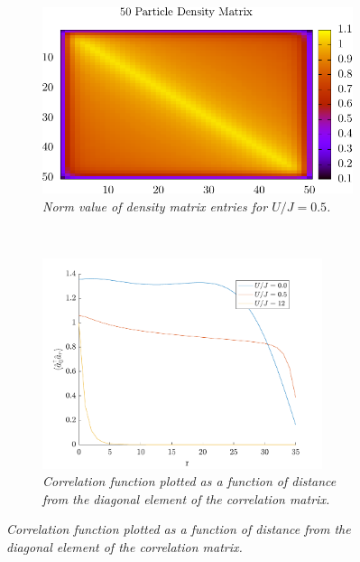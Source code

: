 \begin{figure}[h!]
\begin{subfigure}[t]{0.49\textwidth}
        \label{fig:DensityMatMI}
    \end{subfigure}
    ~
    \begin{subfigure}[t]{0.49\textwidth}
        \includegraphics[width=\textwidth]{Figures/U050.pdf}
        \caption{\textit{Norm value of density matrix entries for $U/J = 0.5$.}}
        \label{fig:DensityMat05}
    \end{subfigure}
    ~
    \begin{subfigure}[t]{0.49\textwidth}
        \includegraphics[width=0.9\textwidth]{Figures/correlationlength.pdf}
	\caption{\textit{Correlation function plotted as a function of distance from the diagonal element of the correlation matrix.}}
	\label{fig:expDecayCorrFunc}
    \end{subfigure}    
\end{figure}
